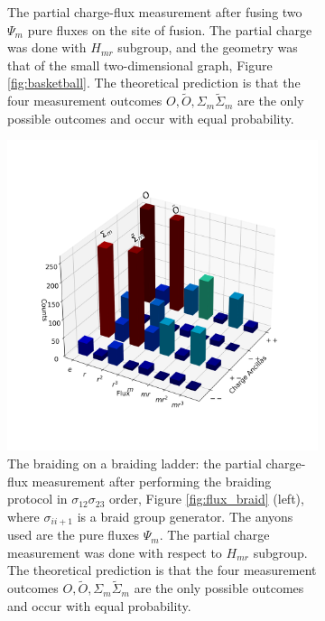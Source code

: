 \documentclass[two column]{article}
\begin{document}
\begin{figure}
\begin{subfigure}{0.47\textwidth}
    \caption{The partial charge-flux measurement after fusing two $\Psi_m$ pure fluxes on the site of fusion. The partial charge was done with $H_{mr}$ subgroup, and the geometry was that of the small two-dimensional graph, Figure \ref{fig:basketball}. The theoretical prediction is that the four measurement outcomes $O,\tilde O,\Sigma_m \tilde{\Sigma}_m$ are the only possible outcomes and occur with equal probability.}
    \label{fig:fusion_basketball}
\end{subfigure}
\vspace{15pt}
\begin{subfigure}{0.47\textwidth}
    \includegraphics[width=\linewidth]{Figures/braid_fusion.png}
    \caption{The braiding on a braiding ladder: the partial charge-flux measurement after performing the braiding protocol in $\sigma_{12}\sigma_{23}$ order, Figure \ref{fig:flux_braid} (left), where $\sigma_{ii+1}$ is a braid group generator. The anyons used are the pure fluxes $\Psi_m$. The partial charge measurement was done with respect to $H_{mr}$ subgroup. The theoretical prediction is that the four measurement outcomes $O,\tilde O,\Sigma_m \tilde{\Sigma}_m$ are the only possible outcomes and occur with equal probability.} 
    \label{fig:braid_fuse}
\end{subfigure}\hfill
\begin{subfigure}{0.47\textwidth}

\end{subfigure}
\end{figure}
\end{document}
